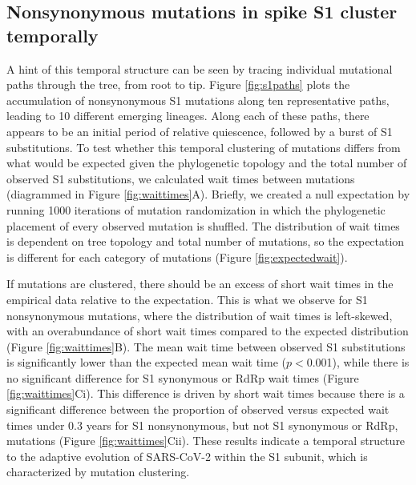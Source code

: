 \documentclass[11pt,oneside,letterpaper]{article}
\begin{document}
\subsection*{Nonsynonymous mutations in spike S1 cluster temporally}
A hint of this temporal structure can be seen by tracing individual mutational paths through the tree, from root to tip.
Figure \ref{fig:s1paths} plots the accumulation of nonsynonymous S1 mutations along ten representative paths, leading to 10 different emerging lineages.
Along each of these paths, there appears to be an initial period of relative quiescence, followed by a burst of S1 substitutions.
To test whether this temporal clustering of mutations differs from what would be expected given the phylogenetic topology and the total number of observed S1 substitutions, we calculated wait times between mutations (diagrammed in Figure \ref{fig:waittimes}A).
Briefly, we created a null expectation by running 1000 iterations of mutation randomization in which the phylogenetic placement of every observed mutation is shuffled.
The distribution of wait times is dependent on tree topology and total number of mutations, so the expectation is different for each category of mutations (Figure \ref{fig:expectedwait}).

If mutations are clustered, there should be an excess of short wait times in the empirical data relative to the expectation.
This is what we observe for S1 nonsynonymous mutations, where the distribution of wait times is left-skewed, with an overabundance of short wait times compared to the expected distribution (Figure \ref{fig:waittimes}B).
The mean wait time between observed S1 substitutions is significantly lower than the expected mean wait time ($p$$<$0.001), while there is no significant difference for S1 synonymous or RdRp wait times (Figure \ref{fig:waittimes}Ci).
This difference is driven by short wait times because there is a significant difference between the proportion of observed versus expected wait times under 0.3 years for S1 nonsynonymous, but not S1 synonymous or RdRp, mutations (Figure \ref{fig:waittimes}Cii).
These results indicate a temporal structure to the adaptive evolution of SARS-CoV-2 within the S1 subunit, which is characterized by mutation clustering.
\end{document}
